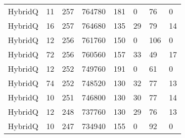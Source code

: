 \begin{table}[h!]
\begin{tabular}{llllllll}
HybridQ                & 11                     & 257            & 764780                  & 181              & 0                    & 76               & 0                   \\
HybridQ                & 16                     & 257            & 764680                  & 135              & 29                   & 79               & 14                  \\
HybridQ                & 12                     & 256            & 761760                  & 150              & 0                    & 106              & 0                   \\
HybridQ                & 72                     & 256            & 760560                  & 157              & 33                   & 49               & 17                  \\
HybridQ                & 12                     & 252            & 749760                  & 191              & 0                    & 61               & 0                   \\
HybridQ                & 74                     & 252            & 748520                  & 130              & 32                   & 77               & 13                  \\
HybridQ                & 10                     & 251            & 746800                  & 130              & 30                   & 77               & 14                  \\
HybridQ                & 12                     & 248            & 737760                  & 130              & 29                   & 76               & 13                  \\
HybridQ                & 10                      & 247            & 734940                  & 155              & 0                    & 92               & 0                  
\end{tabular}
\end{table}



